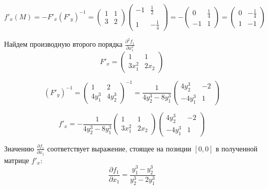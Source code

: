 \documentclass[a5paper, 10pt]{article}
\theoremstyle{definition}
\theoremstyle{plain}
\theoremstyle{remark}
\begin{document}
\begin{equation}
f'_x (M) = - F'_x (F'_y)^{-1}  =
\begin{pmatrix} 
1 & 1 \\
3 & 2
\end{pmatrix}
\begin{pmatrix} 
-1 & \frac{1}{2} \\
\\
1 & - \frac{1}{4}
\end{pmatrix}
= -
\begin{pmatrix}
0 & \frac{1}{4}\\
-1 & 1
\end{pmatrix}
=
\begin{pmatrix}
0 & -\frac{1}{4}\\
1 & -1
\end{pmatrix}
\end{equation}

Найдем производную второго порядка $\frac{\partial ^ 2 f_1}{\partial x_1^2}$
\begin{equation}
F'_x =
\begin{pmatrix} 
1 & 1 \\
3x_1^2 & 2x_2
\end{pmatrix}
\end{equation}

\begin{equation}
(F'_y)^{-1} =
\begin{pmatrix} 
1 & 2 \\
4y_1^3 & 4y_2^3
\end{pmatrix}^{-1}
=
\frac{1}{4y_2^3 - 8y_1^3}
\begin{pmatrix} 
4 y_2^3 & -2 \\
-4y_1^3 & 1
\end{pmatrix}
\end{equation}

\begin{equation}
f'_x =
-\frac{1}{4y_2^3 - 8y_1^3}
\begin{pmatrix} 
1 & 1 \\
3x_1^2 & 2x_2
\end{pmatrix}
\begin{pmatrix} 
4 y_2^3 & -2 \\
-4y_1^3 & 1
\end{pmatrix}
\end{equation}

Значению $\frac{\partial f_1}{\partial x_1}$ соответствует выражение, стоящее на позиции $[0, 0]$ в полученной матрице $f'_x$:
\begin{equation}
\frac{\partial f_1}{\partial x_1} = \frac{ y^3_1 - y^3_2 }{y_2^3 - 2y_1^3}
\end{equation}
\end{document}
